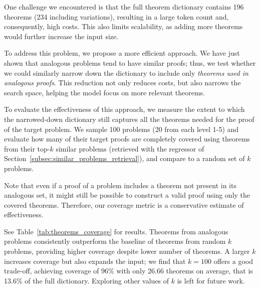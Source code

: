 One challenge we encountered is that the full theorem dictionary contains 196 theorems (234 including  variations), resulting in a large token count and, consequently, 
high costs. This also limits scalability, as adding more theorems would further increase the input size.

To address this problem, we propose a more efficient approach. We have just shown that analogous problems tend to have similar proofs; thus, we test whether we could similarly narrow down the dictionary to include only \emph{theorems used in analogous proofs}. 
This reduction not only reduces costs, but also narrows the search space, helping the model focus on more relevant theorems. 

To evaluate the effectiveness of this approach, we measure the extent to which the narrowed-down dictionary still captures all the theorems needed for the proof of the target problem.
%
We sample 100 problems (20 from each level 1-5) 
and evaluate how many of their target proofs are completely covered using theorems from their top-$k$ similar problems (retrieved with the regressor of  Section~\ref{subsec:similar_problems_retrieval}), and compare to a random set of $k$ problems.

Note that even if a proof of a problem includes a theorem not present in its analogous set, it might still be possible to construct a valid proof using only the covered theorems. %
Therefore, our coverage metric is a conservative estimate of effectiveness.



See Table~\ref{tab:theorems_coverage} for results.  
Theorems from analogous problems consistently outperform the baseline of theorems from random $k$ problems, providing higher coverage despite lower number of theorems. A larger $k$ increases coverage but also expands the input; we find that $k=100$ offers a good trade-off, achieving coverage of 96\% with only 26.66 theorems on average, that is 13.6\% of the full dictionary. Exploring other values of $k$ is left for future work.





